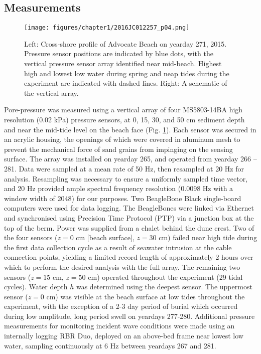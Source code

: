 \subsection{Measurements}\label{subsec:Measurements}

\begin{figure} %
		\noindent\texttt{[image: figures/chapter1/2016JC012257\_p04.png]}
	\caption[Beach profile and buried pressure sensor locations]{Left: Cross-shore profile of Advocate Beach on yearday 271, 2015. Pressure sensor positions are indicated by blue dots, with the vertical pressure sensor array identified near mid-beach. Highest high and lowest low water during spring and neap tides during the experiment are indicated with dashed lines. Right: A schematic of the vertical array.}
	\label{fig:Profile}
\end{figure}

Pore-pressure was measured using a vertical array of four MS5803-14BA high resolution (0.02 kPa) pressure sensors, at 0, 15, 30, and 50 cm sediment depth and near the mid-tide level on the beach face (Fig. \ref{fig:Profile}). Each sensor was secured in an acrylic housing, the openings of which were covered in aluminum mesh to prevent the mechanical force of sand grains from impinging on the sensing surface. The array was installed on yearday 265, and operated from yearday 266 -- 281. Data were sampled at a mean rate of 50 Hz, then resampled at 20 Hz for analysis. Resampling was necessary to ensure a uniformly sampled time vector, and 20 Hz provided ample spectral frequency resolution (0.0098 Hz with a window width of 2048) for our purposes. Two BeagleBone Black single-board computers were used for data logging. The BeagleBones were linked via Ethernet and synchronised using Precision Time Protocol (PTP) via a junction box at the top of the berm. Power was supplied from a chalet behind the dune crest. Two of the four sensors ($z = 0$ cm [beach surface], $z = 30$ cm) failed near high tide during the first data collection cycle as a result of seawater intrusion at the cable connection points, yielding a limited record length of approximately 2 hours over which to perform the desired analysis with the full array. The remaining two sensors ($z = 15$ cm, $z = 50$ cm) operated throughout the experiment (29 tidal cycles). Water depth $h$ was determined using the deepest sensor. The uppermost sensor ($z = 0$ cm) was visible at the beach surface at low tides throughout the experiment, with the exception of a 2-3 day period of burial which occurred during low amplitude, long period swell on yeardays 277-280. Additional pressure measurements for monitoring incident wave conditions were made using an internally logging RBR Duo, deployed on an above-bed frame near lowest low water, sampling continuously at 6 Hz between yeardays 267 and 281.

